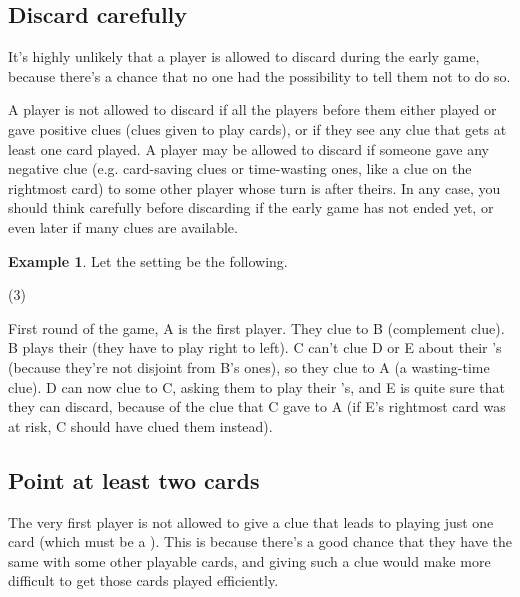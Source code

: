 \documentclass[a4paper]{article}
\theoremstyle{plain}
\theoremstyle{definition}
\newtheorem{example}[theorem]{Example}
\begin{document}
\subsection{Discard carefully}

It's highly unlikely that a player is allowed to discard during the early game, because there's a chance that no one had the possibility to tell them not to do so.

A player is not allowed to discard if all the players before them either played or gave positive clues (clues given to play cards), or if they see any clue that gets at least one card played. A player may be allowed to discard if someone gave any negative clue (e.g. card-saving clues or time-wasting ones, like a  clue on the rightmost card) to some other player whose turn is after theirs. In any case, you should think carefully before discarding if the early game has not ended yet, or even later if many clues are available.

\begin{example}
	
	Let the setting be the following.
	
	\begin{tasks}(3)
		\task[+]      
		\task[A]    
		\task[B]    
		\task[C]    
		\task[D]    
		\task[E]    
	\end{tasks}
	
	First round of the game, A is the first player. They clue  to B (complement clue). B plays their  (they have to play right to left). C can't clue D or E about their 's (because they're not disjoint from B's ones), so they clue  to A (a wasting-time clue). D can now clue  to C, asking them to play their 's, and E is quite sure that they can discard, because of the  clue that C gave to A (if E's rightmost card was at risk, C should have clued them instead).
\end{example}

\subsection{Point at least two cards}

The very first player is not allowed to give a clue that leads to playing just one card (which must be a ). This is because there's a good chance that they have the same  with some other playable cards, and giving such a clue would make more difficult to get those cards played efficiently.
\end{document}
